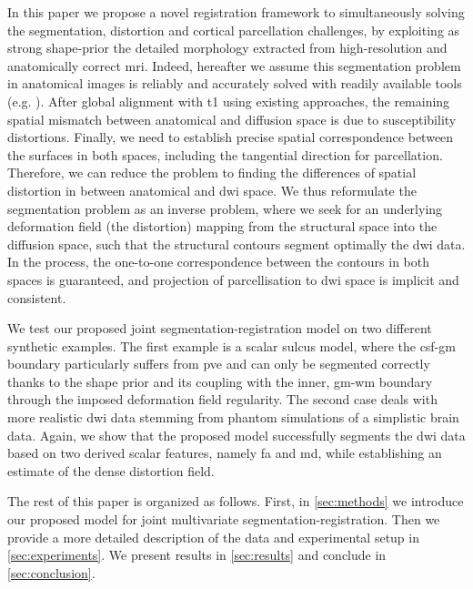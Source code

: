 In this paper we propose a novel registration framework to simultaneously
solving the segmentation, distortion and cortical parcellation challenges,
by exploiting as strong shape-prior the detailed morphology extracted
from high-resolution and anatomically correct \gls{mri}.
Indeed, hereafter
we assume this segmentation problem in anatomical images is reliably and
accurately solved with readily available tools (e.g.
\citep{fischl_freesurfer_2012}).
After global alignment with \gls{t1} using existing approaches, the remaining
spatial mismatch between anatomical and diffusion space is due to susceptibility
distortions.
Finally, we need to establish precise spatial correspondence between the
surfaces in both spaces, including the tangential direction for parcellation.
Therefore, we can reduce the problem to finding the differences of spatial
distortion in between anatomical and \gls{dwi} space.
We thus reformulate the segmentation problem as an inverse problem, where we
seek for an underlying deformation field (the distortion) mapping
from the structural space into the diffusion space, such that the structural
contours segment optimally the \gls{dwi} data.
In the process, the one-to-one
correspondence between the contours in both spaces is guaranteed, and projection
of parcellisation to \gls{dwi} space is implicit and consistent.

We test our proposed joint segmentation-registration model on two different
synthetic examples.
The first example is a scalar sulcus model, where the
\gls{csf}-\gls{gm} boundary particularly suffers from \gls{pve} and can only be
segmented correctly thanks to the shape prior and its coupling with the inner,
\gls{gm}-\gls{wm} boundary through the imposed deformation field regularity.
The second case deals with more realistic \gls{dwi} data stemming from
phantom simulations of a simplistic brain data.
Again, we show that the
proposed model successfully segments the \gls{dwi} data based on two derived
scalar features, namely \gls{fa} and \gls{md}, while establishing an estimate
of the dense distortion field.

The rest of this paper is organized as follows.
First, in \autoref{sec:methods}
we introduce our proposed model for joint multivariate segmentation-registration.
Then we provide a more detailed description of the data and experimental setup in
\autoref{sec:experiments}.
We present results in \autoref{sec:results} and conclude
in \autoref{sec:conclusion}.